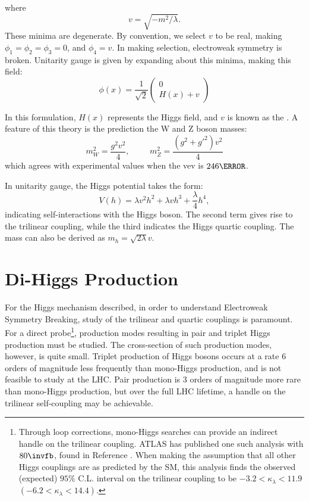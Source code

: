 %
where 
\begin{equation}
    v = \sqrt{-m^2 / \lambda}.
\end{equation}
%
These minima are degenerate. By convention, we select $v$ to be real, making $\phi_1 = \phi_2 = \phi_3 = 0$, and $\phi_4 = v$.  In making selection, electroweak symmetry is broken. Unitarity gauge is given by expanding about this minima, making this field:
\begin{equation}
    \phi(x) = \frac{1}{\sqrt{2}} \begin{pmatrix} 0\\ H(x)+v \end{pmatrix}
\end{equation}

%
In this formulation, $H(x)$ represents the Higgs field, and $v$ is known as the . A feature of this theory is the prediction the W and Z boson masses:
%
\begin{equation}
    m^2_W = \frac{g^2 v^2}{4}, \hspace{1cm} m^2_Z = \frac{(g^2 +g'^2)v^2}{4}
\end{equation}
%
which agrees with experimental values when the \gls{vev} is $\unit{246}{\GeV}$.

In unitarity gauge, the Higgs potential takes the form:
\begin{equation}
    V(h) = \lambda v^2 h^2 + \lambda v h^3 + \frac{\lambda}{4}h^4,
\end{equation}
%
indicating self-interactions with the Higgs boson. The second term gives rise to the trilinear coupling, while the third indicates the Higgs quartic coupling. The mass can also be derived as $m_h = \sqrt{2\lambda}v$. 


\section{Di-Higgs Production}

For the Higgs mechanism described, in order to understand Electroweak Symmetry Breaking, study of the trilinear and quartic couplings is paramount. For a direct probe\footnote{Through loop corrections, mono-Higgs searches can provide an indirect handle on the trilinear coupling. ATLAS has published one such analysis with $\unit{80}{\invfb}$, found in Reference \cite{monohiggs-selfcoupling}. When making the assumption that all other Higgs couplings are as predicted by the \gls{SM}, this analysis finds the observed (expected) $95\%$ C.L. interval on the trilinear coupling to be $-3.2 < \kappa_\lambda <11.9$   $(-6.2 < \kappa_\lambda <14.4)$. }, production modes resulting in pair and triplet Higgs production must be studied. The cross-section of such production modes, however, is quite small. Triplet production of Higgs bosons occurs at a rate 6 orders of magnitude less frequently than mono-Higgs production, and is not feasible to study at the \gls{LHC}. Pair production is 3 orders of magnitude more rare than mono-Higgs production, but over the full \gls{LHC} lifetime, a handle on the trilinear self-coupling may be achievable.

